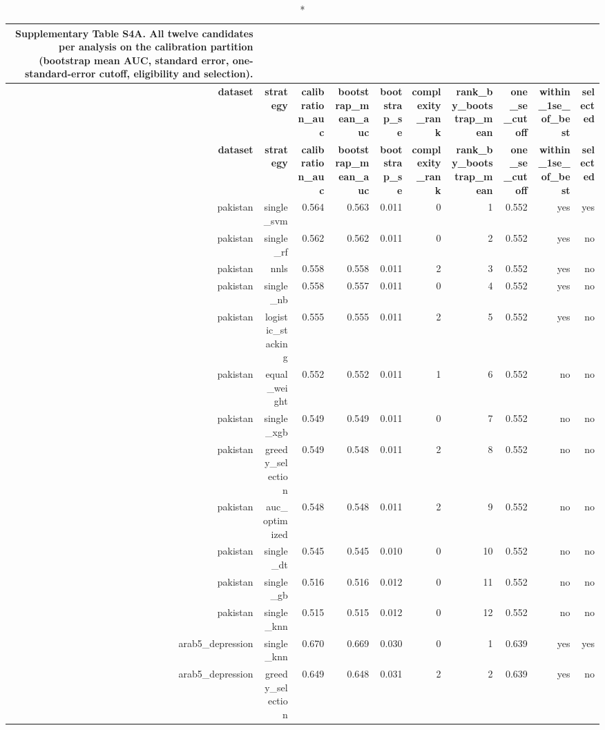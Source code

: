 \documentclass[10pt]{article}
\begin{document}
\tiny
\setlength{\tabcolsep}{2pt}
\begin{longtable}{rrrrrrrrrr}
\caption*{\textbf{Supplementary Table S4A.} All twelve candidates per analysis on the calibration partition (bootstrap mean AUC, standard error, one-standard-error cutoff, eligibility and selection).}\\
\toprule
\textbf{dataset} & \textbf{strategy} & \textbf{calibration\_auc} & \textbf{bootstrap\_mean\_auc} & \textbf{bootstrap\_se} & \textbf{complexity\_rank} & \textbf{rank\_by\_bootstrap\_mean} & \textbf{one\_se\_cutoff} & \textbf{within\_1se\_of\_best} & \textbf{selected} \\
\midrule
\endfirsthead
\toprule
\textbf{dataset} & \textbf{strategy} & \textbf{calibration\_auc} & \textbf{bootstrap\_mean\_auc} & \textbf{bootstrap\_se} & \textbf{complexity\_rank} & \textbf{rank\_by\_bootstrap\_mean} & \textbf{one\_se\_cutoff} & \textbf{within\_1se\_of\_best} & \textbf{selected} \\
\midrule
\endhead
\bottomrule
\endfoot
pakistan & single\_svm & 0.564 & 0.563 & 0.011 & 0 & 1 & 0.552 & yes & yes \\
pakistan & single\_rf & 0.562 & 0.562 & 0.011 & 0 & 2 & 0.552 & yes & no \\
pakistan & nnls & 0.558 & 0.558 & 0.011 & 2 & 3 & 0.552 & yes & no \\
pakistan & single\_nb & 0.558 & 0.557 & 0.011 & 0 & 4 & 0.552 & yes & no \\
pakistan & logistic\_stacking & 0.555 & 0.555 & 0.011 & 2 & 5 & 0.552 & yes & no \\
pakistan & equal\_weight & 0.552 & 0.552 & 0.011 & 1 & 6 & 0.552 & no & no \\
pakistan & single\_xgb & 0.549 & 0.549 & 0.011 & 0 & 7 & 0.552 & no & no \\
pakistan & greedy\_selection & 0.549 & 0.548 & 0.011 & 2 & 8 & 0.552 & no & no \\
pakistan & auc\_optimized & 0.548 & 0.548 & 0.011 & 2 & 9 & 0.552 & no & no \\
pakistan & single\_dt & 0.545 & 0.545 & 0.010 & 0 & 10 & 0.552 & no & no \\
pakistan & single\_gb & 0.516 & 0.516 & 0.012 & 0 & 11 & 0.552 & no & no \\
pakistan & single\_knn & 0.515 & 0.515 & 0.012 & 0 & 12 & 0.552 & no & no \\
arab5\_depression & single\_knn & 0.670 & 0.669 & 0.030 & 0 & 1 & 0.639 & yes & yes \\
arab5\_depression & greedy\_selection & 0.649 & 0.648 & 0.031 & 2 & 2 & 0.639 & yes & no \\

\end{longtable}
\end{document}
